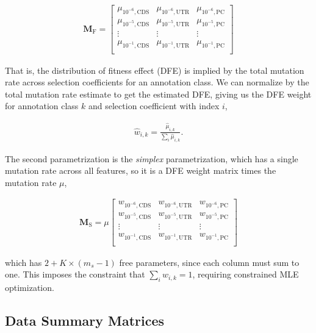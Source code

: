 \documentclass[11pt]{article}
\begin{document}
\begin{align}
  \mathbf{M}_\text{F} = \begin{bmatrix}
    \mu_{10^{-6},\text{CDS}} & \mu_{10^{-6},\text{UTR}} & \mu_{10^{-6},\text{PC}} \\
    \mu_{10^{-5},\text{CDS}} & \mu_{10^{-5},\text{UTR}} & \mu_{10^{-5},\text{PC}} \\
    \vdots & \vdots & \vdots \\
    \mu_{10^{-1},\text{CDS}} & \mu_{10^{-1},\text{UTR}} & \mu_{10^{-1},\text{PC}} \\
  \end{bmatrix}
\end{align}

That is, the distribution of fitness effect (DFE) is implied by
the total mutation rate across selection coefficients for an annotation class.
We can normalize by the total mutation rate estimate to get the estimated DFE,
giving us the DFE weight for annotation class $k$ and selection coefficient
with index $i$,

\begin{align}
  \widehat{w}_{i,k} = \frac{\widehat{\mu}_{i,k}}{\sum_i \widehat{\mu}_{i,k}}.
\end{align}

The second parametrization is the \emph{simplex} parametrization, which has a
single mutation rate across all features, so it is a DFE weight matrix times
the mutation rate $\mu$, 

\begin{align}
  \mathbf{M}_\text{S} = \mu \begin{bmatrix}
    w_{10^{-6},\text{CDS}} & w_{10^{-6},\text{UTR}} & w_{10^{-6},\text{PC}} \\
    w_{10^{-5},\text{CDS}} & w_{10^{-5},\text{UTR}} & w_{10^{-5},\text{PC}} \\
    \vdots & \vdots & \vdots \\
    w_{10^{-1},\text{CDS}} & w_{10^{-1},\text{UTR}} & w_{10^{-1},\text{PC}} \\
  \end{bmatrix}
\end{align}

which has $2 + K \times (m_s-1)$ free parameters, since each column must sum to
one. This imposes the constraint that $\sum_i w_{i,k} = 1$, requiring
constrained MLE optimization. 

\subsection{Data Summary Matrices}
\end{document}
